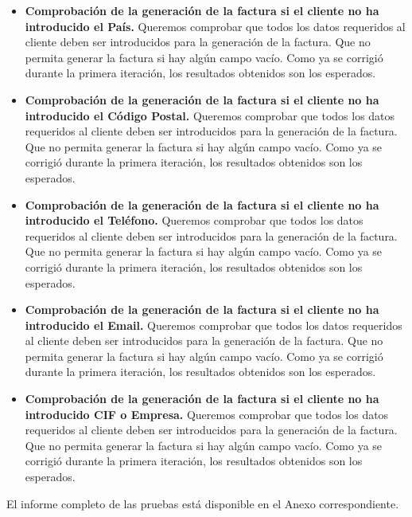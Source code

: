 \begin{itemize}
\begin{itemize}
	\item \textbf{Comprobación de la generación de la factura si el cliente no ha introducido el País.} Queremos comprobar que todos los datos requeridos al cliente deben ser introducidos para la generación de la factura. Que no permita generar la factura si hay algún campo vacío. Como ya se corrigió durante la primera iteración, los resultados obtenidos son los esperados.
	\item \textbf{Comprobación de la generación de la factura si el cliente no ha introducido el Código Postal.} Queremos comprobar que todos los datos requeridos al cliente deben ser introducidos para la generación de la factura. Que no permita generar la factura si hay algún campo vacío. Como ya se corrigió durante la primera iteración, los resultados obtenidos son los esperados.
	\item \textbf{Comprobación de la generación de la factura si el cliente no ha introducido el Teléfono.} Queremos comprobar que todos los datos requeridos al cliente deben ser introducidos para la generación de la factura. Que no permita generar la factura si hay algún campo vacío. Como ya se corrigió durante la primera iteración, los resultados obtenidos son los esperados.
	\item \textbf{Comprobación de la generación de la factura si el cliente no ha introducido el Email.} Queremos comprobar que todos los datos requeridos al cliente deben ser introducidos para la generación de la factura. Que no permita generar la factura si hay algún campo vacío. Como ya se corrigió durante la primera iteración, los resultados obtenidos son los esperados.
	\item \textbf{Comprobación de la generación de la factura si el cliente no ha introducido CIF o Empresa.} Queremos comprobar que todos los datos requeridos al cliente deben ser introducidos para la generación de la factura. Que no permita generar la factura si hay algún campo vacío. Como ya se corrigió durante la primera iteración, los resultados obtenidos son los esperados.
	\end{itemize}			
\end{itemize}
El informe completo de las pruebas está disponible en el Anexo correspondiente.